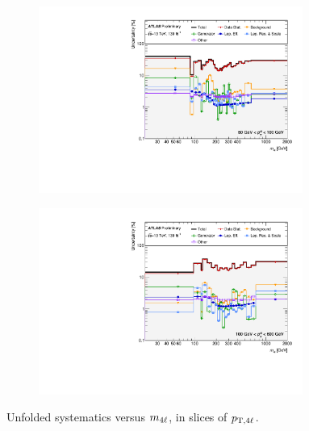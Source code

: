 \begin{figure}[hp]
    \begin{subfigure}{.49\textwidth}\centering\includegraphics[width = 0.95\textwidth]{Figures/m4l/Systematics/Unfolded/UnfoldedSys_M4lvPt4lbin_Stack_Paper3.pdf}\end{subfigure}
    \begin{subfigure}{.49\textwidth}\centering\includegraphics[width = 0.95\textwidth]{Figures/m4l/Systematics/Unfolded/UnfoldedSys_M4lvPt4lbin_Stack_Paper4.pdf}\end{subfigure}
    \caption{Unfolded systematics versus $m_{4\ell}$, in slices of $p_{\mathrm{T},4\ell}$.}
\end{figure}

